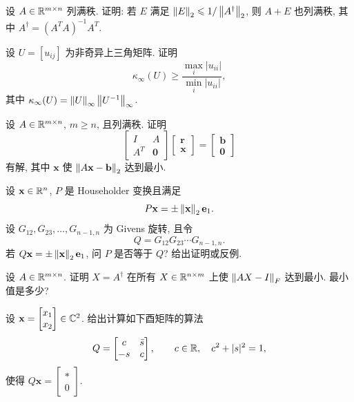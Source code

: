 \begin{exercises}
  \item 设 $A\in\mathbb{R}^{m\times n}$ 列满秩. 证明: 若 $E$ 满足 $\left\|E\right\|_2\leqslant1/\left\|A^{\dagger}\right\|_2$, 则 $A+E$ 也列满秩, 其中 $A^{\dagger}=(A^TA)^{-1}A^T$.

  \item 设 $U=[u_{ij}]$ 为非奇异上三角矩阵. 证明
  \[
    \kappa_\infty(U)\geqslant
    \frac{\underset{i}{\max}|u_{ii}|}{\underset{i}{\min}|u_{ii}|},
  \]
  其中 $\kappa_\infty(U)=\left\|U\right\|_\infty\left\|U^{-1}\right\|_\infty$.

  \item 设 $A\in\mathbb{R}^{m\times n}$, $m\geqslant n$, 且列满秩. 证明
  \[
    \begin{bmatrix}
      I & A\\
      A^T & \mathbf{0}
    \end{bmatrix}
    \begin{bmatrix}
      \mathbf{r}\\
      \mathbf{x}
    \end{bmatrix}
    =
    \begin{bmatrix}
      \mathbf{b}\\
      \mathbf{0}
    \end{bmatrix}
  \]
  有解, 其中 $\mathbf{x}$ 使 $\left\|A\mathbf{x}-\mathbf{b}\right\|_2$ 达到最小.

  \item 设 $\mathbf{x}\in\mathbb{R}^n$, $P$ 是 Householder 变换且满足
  \[
    P\mathbf{x}=\pm\left\|\mathbf{x}\right\|_2\mathbf{e}_1.
  \]
  设 $G_{12},G_{23},\ldots,G_{n-1,n}$ 为 Givens 旋转, 且令
  \[
    Q=G_{12}G_{23}\cdots G_{n-1,n}.
  \]
  若 $Q\mathbf{x}=\pm\left\|\mathbf{x}\right\|_2\mathbf{e}_1$, 问 $P$ 是否等于 $Q$? 给出证明或反例.

  \item 设 $A\in\mathbb{R}^{m\times n}$. 证明 $X=A^{\dagger}$ 在所有 $X\in\mathbb{R}^{n\times m}$ 上使 $\left\|AX-I\right\|_F$ 达到最小. 最小值是多少?

  \item 设
  $\mathbf{x}=
  \begin{bmatrix}
    x_1\\ x_2
  \end{bmatrix}\in\mathbb{C}^2$.
  给出计算如下酉矩阵的算法
  \[
    Q=
    \begin{bmatrix}
      c & \bar{s}\\
      -s & c
    \end{bmatrix},
    \qquad c\in\mathbb{R},\quad c^2+|s|^2=1,
  \]
  使得
  $Q\mathbf{x}=
  \begin{bmatrix}
    *\\ 0
  \end{bmatrix}$.


\end{exercises}
